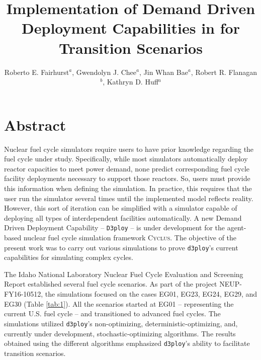 \documentclass{anstrans}
\title{Implementation of Demand Driven Deployment Capabilities in \Cyclus for Transition Scenarios}
\author{Roberto E. Fairhurst$^a$, Gwendolyn J. Chee$^a$, Jin Whan Bae$^a$, Robert R. Flanagan$^b$, Kathryn D. Huff$^a$}
\institute{
$^a$University of Illinois at Urbana-Champaign, Dept. of Nuclear, Plasma, and Radiological Engineering\\
$^b$University of South Carolina, Nuclear Engineering Program\\
ref3@illinois.edu
}
\newcommand{\Cyclus}{\textsc{Cyclus}\xspace}%
\begin{document}
\section{Abstract}

Nuclear fuel cycle simulators require users to have prior knowledge regarding the fuel cycle under study.
Specifically, while most simulators automatically deploy reactor capacities to 
meet power demand, none predict corresponding fuel cycle facility deployments necessary to support 
those reactors. So, users must provide this information when defining the 
simulation. In practice, this requires that the user run the simulator several times until the implemented model reflects reality.
However, this sort of iteration can be simplified with a simulator capable of 
deploying all types of interdependent facilities automatically.
A new Demand Driven Deployment Capability --
\texttt{D3ploy} \cite{chee_demonstration_2019} -- 
is under development for the agent-based nuclear fuel cycle simulation framework \Cyclus \cite{huff_fundamental_2016}.
The objective of the present work was to carry out various simulations to prove 
\texttt{d3ploy}'s current capabilities for simulating complex cycles.

The Idaho National Laboratory Nuclear Fuel Cycle Evaluation and Screening Report \cite{wigeland_nuclear_2014} established
several fuel cycle scenarios.
As part of the project NEUP-FY16-10512, the simulations focused on the cases EG01, EG23, EG24, EG29, and EG30 (Table \ref{tab:1}).
All the scenarios started at EG01 -- representing the current U.S. fuel cycle -- and transitioned to advanced fuel cycles.
The simulations utilized \texttt{d3ploy}'s non-optimizing, deterministic-optimizing, and, currently under development,
stochastic-optimizing algorithms. The results obtained using the different algorithms emphasized \texttt{d3ploy}'s ability
to facilitate transition scenarios.
\end{document}

